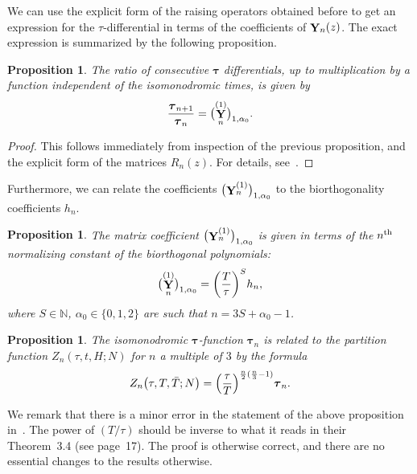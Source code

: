 \documentclass[pdftex]{sigma}
\DeclareMathOperator{\YY}{{\bf Y}}
\numberwithin{equation}{section}
\newtheorem{Proposition}[Theorem]{Proposition}
 { \theoremstyle{definition}
\newtheorem{Definition}[Theorem]{Definition}
\newtheorem{Note}[Theorem]{Note}
\newtheorem{Example}[Theorem]{Example}
\newtheorem{Remark}[Theorem]{Remark} }
\begin{document}
We can use the explicit form of the raising operators obtained before to get an expression for the $\tau$-differential in terms of the coefficients of
$\YY_n(z)$. The exact expression is summarized by the following proposition.
\begin{Proposition}
 The ratio of consecutive $\boldsymbol{\tau}$ differentials, up to multiplication by a function independent of the isomonodromic times, is given by
 \begin{equation*}
 \frac{\boldsymbol{\tau}_{n+1}}{\boldsymbol{\tau}_n} = \bigl(\YY_{n}^{(1)}\bigr)_{1,\alpha_0}.
 \end{equation*}
\end{Proposition}
\begin{proof}
 This follows immediately from inspection of the previous proposition, and the explicit form of the matrices $R_n(z)$. For details, see~\cite{Bertola-Marchal}.
\end{proof}

Furthermore, we can relate the coefficients $\bigl(\YY_{n}^{(1)}\bigr)_{1,\alpha_0}$ to the biorthogonality coefficients $h_n$.
\begin{Proposition}
 The matrix coefficient $\bigl(\YY_{n}^{(1)}\bigr)_{1,\alpha_0}$ is given in terms of the $n^{\rm th}$ normalizing constant of the biorthogonal polynomials:
 \begin{equation*}
 \bigl(\YY_{n}^{(1)}\bigr)_{1,\alpha_0} = \biggl(\frac{T}{\tau}\biggr)^S h_n,
 \end{equation*}
 where $S\in \mathbb{N}$, $\alpha_0 \in \{0,1,2\}$ are such that $n = 3S + \alpha_0 -1$.
\end{Proposition}


\begin{Proposition}
 The isomonodromic $\boldsymbol{\tau}$-function $\boldsymbol{\tau}_n$ is related to the partition function $Z_n(\tau,t,\allowbreak H;N)$ for $n$ a multiple of $3$ by
 the formula
 \begin{equation*}
 Z_n\bigl(\tau,T,\bar{T};N\bigr) = \Bigl(\frac{\tau}{T}\Bigr)^{\frac{n}{2}(\frac{n}{3}-1)} \boldsymbol{\tau}_n.
 \end{equation*}
\end{Proposition}
\begin{Remark}
 We remark that there is a minor error in the statement of the above proposition in~\cite{Bertola-Marchal}. The power of $(T/\tau)$ should be inverse to what it reads in their Theorem~3.4 (see page~17). The proof is otherwise correct, and there are no essential changes to the results otherwise.
\end{Remark}
\end{document}
